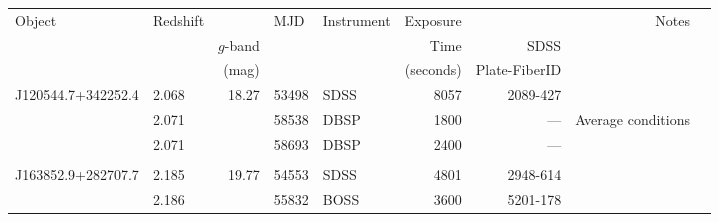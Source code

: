 \documentclass[a4paper,fleqn,usenatbib]{mnras}
\begin{document}
\begin{table}
  \centering
  \begin{tabular}{l l   r ll   r r r l}
    \hline 
    \hline 
    \multirow{3}{*}{Object} & \multirow{3}{*}{Redshift} &                        & \multirow{3}{*}{MJD} &  \multirow{3}{*}{Instrument}  & Exposure      &                   & \multirow{3}{*}{Notes} \\
                            &                                                     &   {$g$-band}   &                                 &                                              &  Time           &    SDSS             & \\
                                       &                                          &    (mag)           &                                 &                                              & (seconds)    & Plate-FiberID  & \\
    \hline  
    J120544.7+342252.4   & 2.068                               &   18.27             &  53498                   & SDSS             &  8057                  & 2089-427             & \\
                                        & 2.071                                &                        &  58538                   & DBSP            &  1800                  &  ---                      &  Average conditions \\
                                         & 2.071                               &                         &  58693                  & DBSP            &  2400                   &  ---                      &   \\
                                         &                                       &                          &                                &                          &                     &                               &                              & \\
    J163852.9+282707.7   & 2.185                            &   19.77               &  54553                   & SDSS           &   4801                    &  2948-614              & \\
    	                                 &  2.186                            &                          &  55832                  & BOSS            &   3600                   &  5201-178            & \\

\end{tabular}
\end{table}
\end{document}
